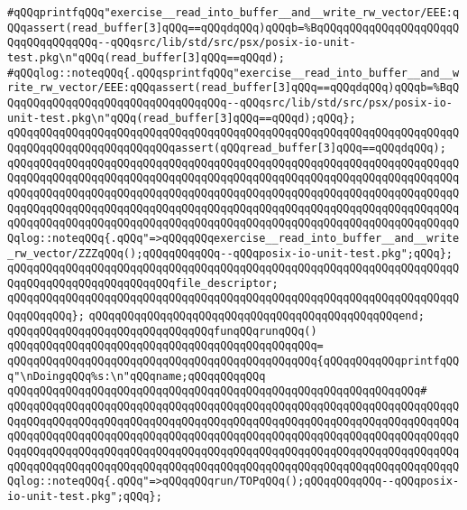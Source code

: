 \verb|#qQQqprintfqQQq"exercise__read_into_buffer__and__write_rw_vector/EEE:qQQqassert(read_buffer[3]qQQq==qQQqdqQQq)qQQqb=%BqQQqqQQqqQQqqQQqqQQqqQQqqQQqqQQqqQQq--qQQqsrc/lib/std/src/psx/posix-io-unit-test.pkg\n"qQQq(read_buffer[3]qQQq==qQQqd);|\newline
\verb|#qQQqlog::noteqQQq{.qQQqsprintfqQQq"exercise__read_into_buffer__and__write_rw_vector/EEE:qQQqassert(read_buffer[3]qQQq==qQQqdqQQq)qQQqb=%BqQQqqQQqqQQqqQQqqQQqqQQqqQQqqQQqqQQq--qQQqsrc/lib/std/src/psx/posix-io-unit-test.pkg\n"qQQq(read_buffer[3]qQQq==qQQqd);qQQq};|\newline
\verb|qQQqqQQqqQQqqQQqqQQqqQQqqQQqqQQqqQQqqQQqqQQqqQQqqQQqqQQqqQQqqQQqqQQqqQQqqQQqqQQqqQQqqQQqqQQqqQQqassert(qQQqread_buffer[3]qQQq==qQQqdqQQq);|\newline
\newline
\verb|qQQqqQQqqQQqqQQqqQQqqQQqqQQqqQQqqQQqqQQqqQQqqQQqqQQqqQQqqQQqqQQqqQQqqQQqqQQqqQQqqQQqqQQqqQQqqQQqqQQqqQQqqQQqqQQqqQQqqQQqqQQqqQQqqQQqqQQqqQQqqQQqqQQqqQQqqQQqqQQqqQQqqQQqqQQqqQQqqQQqqQQqqQQqqQQqqQQqqQQqqQQqqQQqqQQqqQQqqQQqqQQqqQQqqQQqqQQqqQQqqQQqqQQqqQQqqQQqqQQqqQQqqQQqqQQqqQQqqQQqqQQqqQQqqQQqqQQqqQQqqQQqqQQqqQQqqQQqqQQqqQQqqQQqqQQqqQQqqQQqqQQqqQQqqQQqlog::noteqQQq{.qQQq"=>qQQqqQQqexercise__read_into_buffer__and__write_rw_vector/ZZZqQQq();qQQqqQQqqQQq--qQQqposix-io-unit-test.pkg";qQQq};|\newline
\verb|qQQqqQQqqQQqqQQqqQQqqQQqqQQqqQQqqQQqqQQqqQQqqQQqqQQqqQQqqQQqqQQqqQQqqQQqqQQqqQQqqQQqqQQqqQQqqQQqfile_descriptor;|\newline
\verb|qQQqqQQqqQQqqQQqqQQqqQQqqQQqqQQqqQQqqQQqqQQqqQQqqQQqqQQqqQQqqQQqqQQqqQQqqQQqqQQq};|\newline
\verb|qQQqqQQqqQQqqQQqqQQqqQQqqQQqqQQqqQQqqQQqqQQqqQQqend;|\newline
\newline
\verb|qQQqqQQqqQQqqQQqqQQqqQQqqQQqqQQqfunqQQqrunqQQq()|\newline
\verb|qQQqqQQqqQQqqQQqqQQqqQQqqQQqqQQqqQQqqQQqqQQqqQQq=|\newline
\verb|qQQqqQQqqQQqqQQqqQQqqQQqqQQqqQQqqQQqqQQqqQQqqQQq{qQQqqQQqqQQqprintfqQQq"\nDoingqQQq%s:\n"qQQqname;qQQqqQQqqQQq|\newline
\verb|qQQqqQQqqQQqqQQqqQQqqQQqqQQqqQQqqQQqqQQqqQQqqQQqqQQqqQQqqQQqqQQq#|\newline
\verb|qQQqqQQqqQQqqQQqqQQqqQQqqQQqqQQqqQQqqQQqqQQqqQQqqQQqqQQqqQQqqQQqqQQqqQQqqQQqqQQqqQQqqQQqqQQqqQQqqQQqqQQqqQQqqQQqqQQqqQQqqQQqqQQqqQQqqQQqqQQqqQQqqQQqqQQqqQQqqQQqqQQqqQQqqQQqqQQqqQQqqQQqqQQqqQQqqQQqqQQqqQQqqQQqqQQqqQQqqQQqqQQqqQQqqQQqqQQqqQQqqQQqqQQqqQQqqQQqqQQqqQQqqQQqqQQqqQQqqQQqqQQqqQQqqQQqqQQqqQQqqQQqqQQqqQQqqQQqqQQqqQQqqQQqqQQqqQQqqQQqqQQqqQQqqQQqlog::noteqQQq{.qQQq"=>qQQqqQQqrun/TOPqQQq();qQQqqQQqqQQq--qQQqposix-io-unit-test.pkg";qQQq};|\newline

